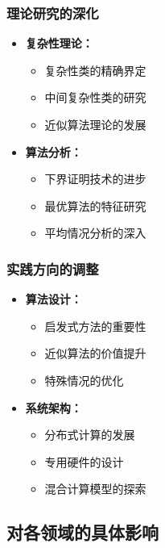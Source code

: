 \documentclass[a4paper,12pt]{ctexart}
\begin{document}
\subsubsection{理论研究的深化}
\begin{itemize}
    \item \textbf{复杂性理论：}
        \begin{itemize}
            \item 复杂性类的精确界定
            \item 中间复杂性类的研究
            \item 近似算法理论的发展
        \end{itemize}
    \item \textbf{算法分析：}
        \begin{itemize}
            \item 下界证明技术的进步
            \item 最优算法的特征研究
            \item 平均情况分析的深入
        \end{itemize}
\end{itemize}

\subsubsection{实践方向的调整}
\begin{itemize}
    \item \textbf{算法设计：}
        \begin{itemize}
            \item 启发式方法的重要性
            \item 近似算法的价值提升
            \item 特殊情况的优化
        \end{itemize}
    \item \textbf{系统架构：}
        \begin{itemize}
            \item 分布式计算的发展
            \item 专用硬件的设计
            \item 混合计算模型的探索
        \end{itemize}
\end{itemize}

\subsection{对各领域的具体影响}
\end{document}
